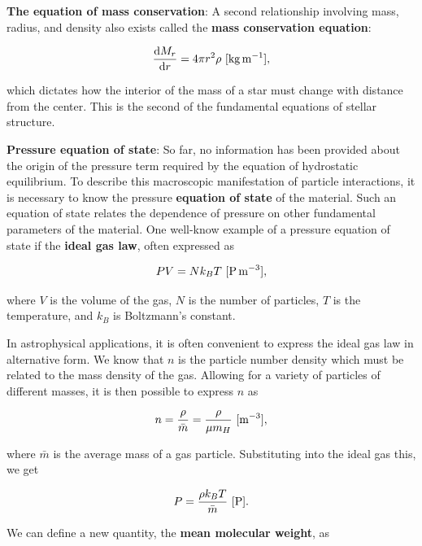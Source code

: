 \documentclass[a4paper,10pt]{article}
\begin{document}
{\noindent}\textbf{The equation of mass conservation}: A second relationship involving mass, radius, and density also exists called the \textbf{mass conservation equation}: 

\begin{align*}
    \frac{{\rm d}M_r}{{\rm d}r} = 4\pi r^2\rho ~ [{\rm kg\,m^{-1}}],
\end{align*}

{\noindent}which dictates how the interior of the mass of a star must change with distance from the center. This is the second of the fundamental equations of stellar structure. 

{\noindent}\textbf{Pressure equation of state}: So far, no information has been provided about the origin of the pressure term required by the equation of hydrostatic equilibrium. To describe this macroscopic manifestation of particle interactions, it is necessary to know the pressure \textbf{equation of state} of the material. Such an equation of state relates the dependence of pressure on other fundamental parameters of the material. One well-know example of a pressure equation of state if the \textbf{ideal gas law}, often expressed as

\begin{align*}
    PV = Nk_BT ~ [{\rm P\,m^{-3}}],
\end{align*}

{\noindent}where $V$ is the volume of the gas, $N$ is the number of particles, $T$ is the temperature, and $k_B$ is Boltzmann's constant.

{\noindent}In astrophysical applications, it is often convenient to express the ideal gas law in alternative form. We know that $n$ is the particle number density which must be related to the mass density of the gas. Allowing for a variety of particles of different masses, it is then possible to express $n$ as

\begin{align*}
    n = \frac{\rho}{\bar{m}} = \frac{\rho}{\mu m_H} ~ [{\rm m^{-3}}],
\end{align*}

{\noindent}where $\bar{m}$ is the average mass of a gas particle. Substituting into the ideal gas this, we get

\begin{align*}
    P = \frac{\rho k_BT}{\bar{m}} ~ [{\rm P}].
\end{align*}

{\noindent}We can define a new quantity, the \textbf{mean molecular weight}, as
\end{document}
